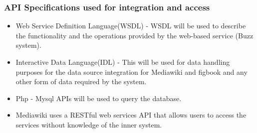 \subsubsection{API Specifications used for integration and access}
\begin{itemize}
\item Web Service Definition Language(WSDL) - WSDL will be used to describe the functionality and the operations provided by the web-based service (Buzz system).
\item Interactive Data Language(IDL) - This will be used for data handling purposes for the data source integration for Mediawiki and figbook and any other form of data required by the system.
\item Php - Mysql APIs will be used to query the database.
\item Mediawiki uses a RESTful web services API that allows users to access the services without knowledge of the inner system. 
\end{itemize}


